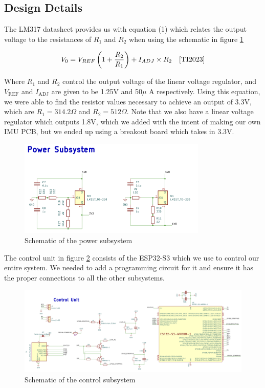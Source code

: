 \subsection{Design Details}
The LM317 datasheet \cite{TI2023} provides us with equation (1) which relates the output voltage to the resistances of $R_1$ and $R_2$ when using the schematic in figure \ref{fig:power_sub}

\begin{equation}
V_0 = V_{REF} \left(1 + \frac{R_2}{R_1}\right) + I_{ADJ} \times R_2 \quad \cite{TI2023}
\end{equation}

Where $R_1$ and $R_2$ control the output voltage of the linear voltage regulator, and $V_{\text{REF}}$ and $I_{\text{ADJ}}$ are given to be 1.25V and 50$\mu$ A respectively. Using this equation, we were able to find the resistor values necessary to achieve an output of 3.3V, which are $R_1 = 314.2 \Omega$ and $R_2 = 512 \Omega$. Note that we also have a linear voltage regulator which outputs 1.8V, which we added with the intent of making our own IMU PCB, but we ended up using a breakout board which takes in 3.3V.

\begin{figure}[ht]
    \centering
    \includegraphics[width=0.8\textwidth]{images/power_sub.png}
    \caption{Schematic of the power subsystem}
    \label{fig:power_sub}
\end{figure}
\newpage
The control unit in figure \ref{fig:control_sub} consists of the ESP32-S3 \cite{EspressifESP32} which we use to control our entire system. We needed to add a programming circuit for it and ensure it has the proper connections to all the other subsystems.

\begin{figure}[ht]
    \centering
    \includegraphics[width=1.0\textwidth]{images/control_sub.png}
    \caption{Schematic of the control subsystem}
    \label{fig:control_sub}
\end{figure}

